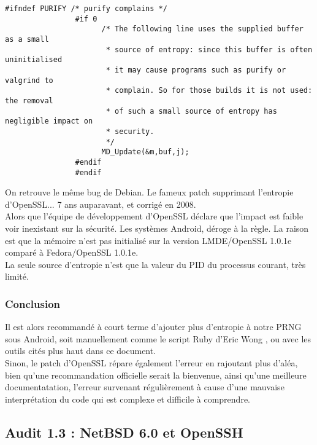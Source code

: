 			\begin{lstlisting}[style=customc,caption=ssleay\_rand\_bytes.c,
			 label=ssleayrandbytes]
				#ifndef PURIFY /* purify complains */
				#if 0
				      /* The following line uses the supplied buffer as a small
				       * source of entropy: since this buffer is often uninitialised
				       * it may cause programs such as purify or valgrind to
				       * complain. So for those builds it is not used: the removal
				       * of such a small source of entropy has negligible impact on
				       * security.
				       */
				      MD_Update(&m,buf,j);
				#endif
				#endif
			\end{lstlisting}
			
			On retrouve le même bug de Debian. Le fameux patch supprimant 
			l'entropie d'OpenSSL... 7 ans auparavant, et corrigé en 2008.\\
			
			Alors que l'équipe de développement d'OpenSSL déclare que l'impact
			est faible voir inexistant sur la sécurité. Les systèmes Android, 
			déroge à la règle. La raison est que la mémoire n'est pas initialisé
			sur la version LMDE/OpenSSL 1.0.1e comparé à Fedora/OpenSSL 1.0.1e.\\
			
			La seule source d'entropie n'est que la valeur du PID du processus
			courant, très limité.

		\subsubsection{Conclusion}		
		
			Il est alors recommandé à court terme d'ajouter plus d'entropie à
			notre PRNG sous Android, soit manuellement comme le script Ruby
			d'Eric Wong \cite{boblet2013android}, ou avec les outils cités plus
			haut dans ce document.\\
			
			Sinon, le patch d'OpenSSL \cite{alex2013android} répare également
			l'erreur en rajoutant plus d'aléa, bien qu'une recommandation 
			officielle serait la bienvenue, ainsi qu'une meilleure 
			documentatation, l'erreur survenant régulièrement à cause d'une
			mauvaise interprétation du code qui est complexe et difficile à
			comprendre.\\

			
	\subsection{Audit 1.3 : NetBSD 6.0 et OpenSSH}
